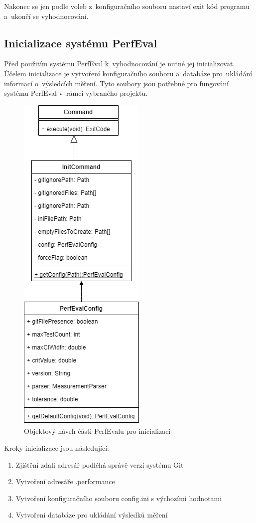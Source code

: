 Nakonec se jen podle voleb z~konfiguračního souboru nastaví exit kód programu a~ukončí se vyhodnocování.

\subsection{Inicializace systému PerfEval}

Před použitím systému PerfEval k~vyhodnocování je nutné jej inicializovat.
Účelem inicializace je vytvoření konfiguračního souboru a~databáze pro~ukládání informací o~výsledcích měření.
Tyto soubory jsou potřebné pro fungování systému PerfEval v~rámci vybraného projektu.

\begin{figure}[!ht]
    \centering
    \includegraphics[height=0.47\textheight]{../img/perfeval_init.png}
    \caption{Objektový návrh části PerfEvalu pro inicializaci}
\end{figure}

Kroky inicializace jsou následující:
\begin{enumerate}
    \item Zjištění zdali adresář podléhá správě verzí systému Git
    \item Vytvoření adresáře .performance
    \item Vytvoření konfiguračního souboru config.ini s výchozími hodnotami
    \item Vytvoření databáze pro ukládání výsledků měření
\end{enumerate}

